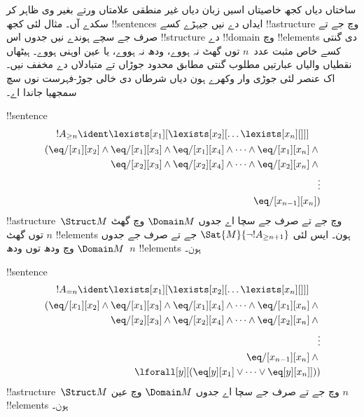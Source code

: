 \documentclass[../../../include/open-logic-section]{subfiles}
\begin{document}


\begin{explain}
ساختاں دیاں کجھ خاصیتاں اسیں زبان دیاں غیر منطقی علامتاں
ورتے بغیر وی ظاہر کر سکدے آں۔ مثال لئی کجھ
!!{sentence}s ایداں دے نیں جیہڑے کسے !!a{structure}
وچ جے تے صرف جے سچے ہوندے نیں جدوں اس !!{structure}
دے !!{domain} وچ !!{element}s دی گنتی کسے خاص
مثبت عدد~$n$ توں گھٹ نہ ہووے، ودھ نہ ہووے، یا عین اوہنی ہووے۔
ہیٹھاں نقطیاں والیاں عبارتیں مطلوب گنتی مطابق محدود جوڑاں
تے متبادلاں دے مخفف نیں۔ اک عنصر لئی جوڑی وار وکھرے ہون
دیاں شرطاں دی خالی جوڑ-فہرست نوں سچ سمجھیا جاندا اے۔
\end{explain}

\begin{prop}
!!{sentence}
\begin{multline*}
  !A_{\ge n} \ident \lexists[x_1][\lexists[x_2][\dots\lexists[x_n][{}]]]\\
  \begin{aligned}
  (\eq/[x_1][x_2] \land {}
  \eq/[x_1][x_3] \land \eq/[x_1][x_4] \land \dots \land \eq/[x_1][x_n] \land {}\\
\eq/[x_2][x_3] \land \eq/[x_2][x_4] \land \dots \land {} \eq/[x_2][x_n] \land {} \\
\vdots\\
\eq/[x_{n-1}][x_n])
\end{aligned}
\end{multline*}
!!a{structure}~$\Struct M$ وچ جے تے صرف جے سچا اے
جدوں $\Domain M$ وچ گھٹ توں گھٹ $n$ !!{element}s
ہون۔ ایس لئی $\Sat{M}{\lnot !A_{\ge n+1}}$ جے تے
صرف جے جدوں $\Domain M$ وچ ودھ توں ودھ~$n$
!!{element}s ہون۔

\end{prop}

\begin{prop}
!!{sentence}
\begin{multline*}
!A_{= n} \ident \lexists[x_1][\lexists[x_2][\dots\lexists[x_n][{}]]] \\
\begin{aligned}
  (\eq/[x_1][x_2] \land {}
  \eq/[x_1][x_3] \land \eq/[x_1][x_4] \land \dots \land \eq/[x_1][x_n] \land {}\\
\eq/[x_2][x_3] \land \eq/[x_2][x_4] \land \dots \land {} \eq/[x_2][x_n] \land {} \\
\vdots\\
\eq/[x_{n-1}][x_n] \land {} \\
\lforall[y][(\eq[y][x_1] \lor \dots \lor \eq[y][x_n]]))
\end{aligned}
\end{multline*}
!!a{structure}~$\Struct M$ وچ جے تے صرف جے سچا اے
جدوں $\Domain M$ وچ عین $n$ !!{element}s ہون۔
\end{prop}
\end{document}
